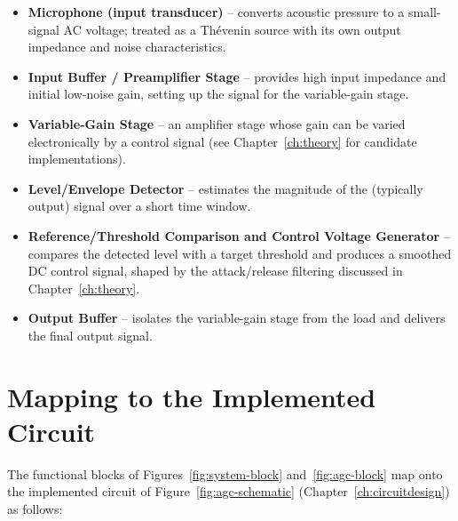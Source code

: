 \begin{itemize}
    \item \textbf{Microphone (input transducer)} -- converts acoustic pressure to a small-signal AC voltage; treated as a Th\'{e}venin source with its own output impedance and noise characteristics.
    \item \textbf{Input Buffer / Preamplifier Stage} -- provides high input impedance and initial low-noise gain, setting up the signal for the variable-gain stage.
    \item \textbf{Variable-Gain Stage} -- an amplifier stage whose gain can be varied electronically by a control signal (see Chapter~\ref{ch:theory} for candidate implementations).
    \item \textbf{Level/Envelope Detector} -- estimates the magnitude of the (typically output) signal over a short time window.
    \item \textbf{Reference/Threshold Comparison and Control Voltage Generator} -- compares the detected level with a target threshold and produces a smoothed DC control signal, shaped by the attack/release filtering discussed in Chapter~\ref{ch:theory}.
    \item \textbf{Output Buffer} -- isolates the variable-gain stage from the load and delivers the final output signal.
\end{itemize}

\section{Mapping to the Implemented Circuit}
\label{sec:implementation-mapping}

The functional blocks of Figures~\ref{fig:system-block} and~\ref{fig:agc-block} map onto the implemented circuit of Figure~\ref{fig:agc-schematic} (Chapter~\ref{ch:circuitdesign}) as follows:

